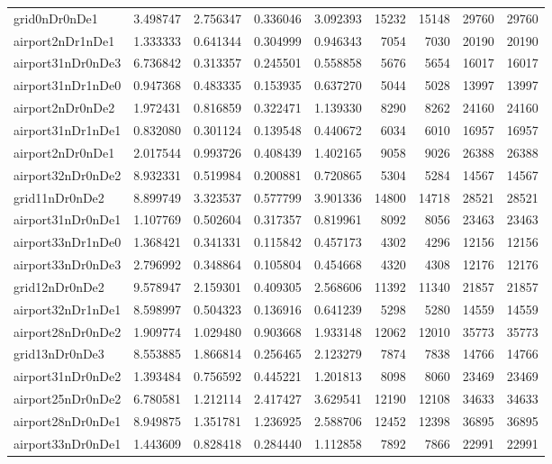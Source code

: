 \begin{longtable}{|l|r|r|r|r|r|r|r|r|}
grid0nDr0nDe1 & 3.498747 & 2.756347 & 0.336046 & 3.092393 & 15232 & 15148 & 29760 & 29760 \\
airport2nDr1nDe1 & 1.333333 & 0.641344 & 0.304999 & 0.946343 & 7054 & 7030 & 20190 & 20190 \\
airport31nDr0nDe3 & 6.736842 & 0.313357 & 0.245501 & 0.558858 & 5676 & 5654 & 16017 & 16017 \\
airport31nDr1nDe0 & 0.947368 & 0.483335 & 0.153935 & 0.637270 & 5044 & 5028 & 13997 & 13997 \\
airport2nDr0nDe2 & 1.972431 & 0.816859 & 0.322471 & 1.139330 & 8290 & 8262 & 24160 & 24160 \\
airport31nDr1nDe1 & 0.832080 & 0.301124 & 0.139548 & 0.440672 & 6034 & 6010 & 16957 & 16957 \\
airport2nDr0nDe1 & 2.017544 & 0.993726 & 0.408439 & 1.402165 & 9058 & 9026 & 26388 & 26388 \\
airport32nDr0nDe2 & 8.932331 & 0.519984 & 0.200881 & 0.720865 & 5304 & 5284 & 14567 & 14567 \\
grid11nDr0nDe2 & 8.899749 & 3.323537 & 0.577799 & 3.901336 & 14800 & 14718 & 28521 & 28521 \\
airport31nDr0nDe1 & 1.107769 & 0.502604 & 0.317357 & 0.819961 & 8092 & 8056 & 23463 & 23463 \\
airport33nDr1nDe0 & 1.368421 & 0.341331 & 0.115842 & 0.457173 & 4302 & 4296 & 12156 & 12156 \\
airport33nDr0nDe3 & 2.796992 & 0.348864 & 0.105804 & 0.454668 & 4320 & 4308 & 12176 & 12176 \\
grid12nDr0nDe2 & 9.578947 & 2.159301 & 0.409305 & 2.568606 & 11392 & 11340 & 21857 & 21857 \\
airport32nDr1nDe1 & 8.598997 & 0.504323 & 0.136916 & 0.641239 & 5298 & 5280 & 14559 & 14559 \\
airport28nDr0nDe2 & 1.909774 & 1.029480 & 0.903668 & 1.933148 & 12062 & 12010 & 35773 & 35773 \\
grid13nDr0nDe3 & 8.553885 & 1.866814 & 0.256465 & 2.123279 & 7874 & 7838 & 14766 & 14766 \\
airport31nDr0nDe2 & 1.393484 & 0.756592 & 0.445221 & 1.201813 & 8098 & 8060 & 23469 & 23469 \\
airport25nDr0nDe2 & 6.780581 & 1.212114 & 2.417427 & 3.629541 & 12190 & 12108 & 34633 & 34633 \\
airport28nDr0nDe1 & 8.949875 & 1.351781 & 1.236925 & 2.588706 & 12452 & 12398 & 36895 & 36895 \\
airport33nDr0nDe1 & 1.443609 & 0.828418 & 0.284440 & 1.112858 & 7892 & 7866 & 22991 & 22991 \\

\end{longtable}
